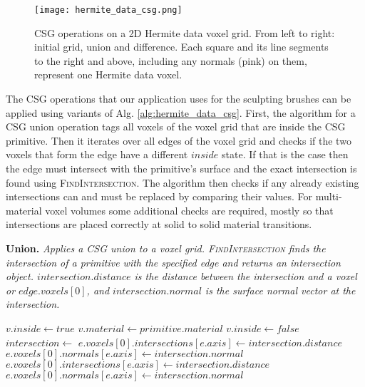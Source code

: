 \begin{figure}
\centering
\captionsetup{width=0.8\textwidth}
\texttt{[image: hermite\_data\_csg.png]}
\caption{CSG operations on a 2D Hermite data voxel grid. From left to right: initial grid, union and difference. Each square and its line segments to the right and above,
including any normals (pink) on them, represent one Hermite data voxel.}
\label{fig:hermite_data_csg}
\end{figure}

The CSG operations that our application uses for the sculpting brushes can be applied using variants of Alg. \ref{alg:hermite_data_csg}. 
First, the algorithm for a CSG union operation tags all voxels of the voxel grid that are inside the CSG primitive. Then it iterates over all edges of the voxel grid and checks if the two voxels
that form the edge have a different $inside$ state. If that is the case then the edge must intersect with the primitive's surface and the exact intersection is found
using \textsc{FindIntersection}. The algorithm then checks if any already existing intersections can and must be replaced by comparing their values. For multi-material voxel volumes some additional checks are required, mostly so that intersections are placed correctly at solid to solid material transitions.

\begin{algorithm}[H]
\small
\caption{\textbf{Union.} \textit{Applies a CSG union to a voxel grid. \textsc{FindIntersection} finds the intersection of a primitive with the specified edge
and returns an intersection object. $intersection.distance$ is the distance between the intersection and a voxel or $edge.voxels[0]$, and $intersection.normal$ is the 
surface normal vector at the intersection.}}\label{alg:hermite_data_csg}
\begin{algorithmic}[1]
				\State $v.inside \gets true$
				\State $v.material \gets primitive.material$
			\Else
				\State $v.inside \gets false$
			\EndIf
	\EndFor
			\State $intersection \gets$ 
				\State $e.voxels[0].intersections[e.axis] \gets intersection.distance$
				\State $e.voxels[0].normals[e.axis] \gets intersection.normal$
				\State $e.voxels[0].intersections[e.axis] \gets intersection.distance$
				\State $e.voxels[0].normals[e.axis] \gets intersection.normal$
			\EndIf
		\EndIf
	\EndFor
\EndProcedure
\end{algorithmic}
\end{algorithm}


